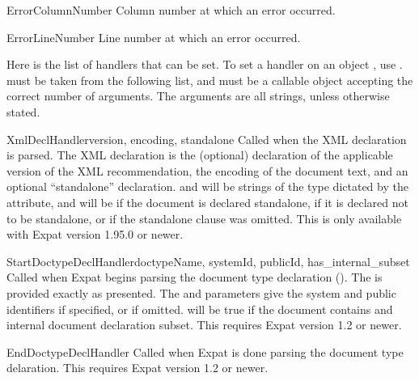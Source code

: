 \begin{memberdesc}[xmlparser]{ErrorColumnNumber} 
Column number at which an error occurred.
\end{memberdesc}

\begin{memberdesc}[xmlparser]{ErrorLineNumber}
Line number at which an error occurred.
\end{memberdesc}

Here is the list of handlers that can be set.  To set a handler on an
 object , use
.   must
be taken from the following list, and  must be a callable
object accepting the correct number of arguments.  The arguments are
all strings, unless otherwise stated.

\begin{methoddesc}[xmlparser]{XmlDeclHandler}{version, encoding, standalone}
Called when the XML declaration is parsed.  The XML declaration is the
(optional) declaration of the applicable version of the XML
recommendation, the encoding of the document text, and an optional
``standalone'' declaration.   and  will be
strings of the type dictated by the 
attribute, and  will be  if the document is
declared standalone,  if it is declared not to be standalone,
or  if the standalone clause was omitted.
This is only available with Expat version 1.95.0 or newer.
\end{methoddesc}

\begin{methoddesc}[xmlparser]{StartDoctypeDeclHandler}{doctypeName,
                                                       systemId, publicId,
                                                       has_internal_subset}
Called when Expat begins parsing the document type declaration
().  The  is provided exactly
as presented.  The  and  parameters give
the system and public identifiers if specified, or  if
omitted.   will be true if the document
contains and internal document declaration subset.
This requires Expat version 1.2 or newer.
\end{methoddesc}

\begin{methoddesc}[xmlparser]{EndDoctypeDeclHandler}{}
Called when Expat is done parsing the document type delaration.
This requires Expat version 1.2 or newer.
\end{methoddesc}

